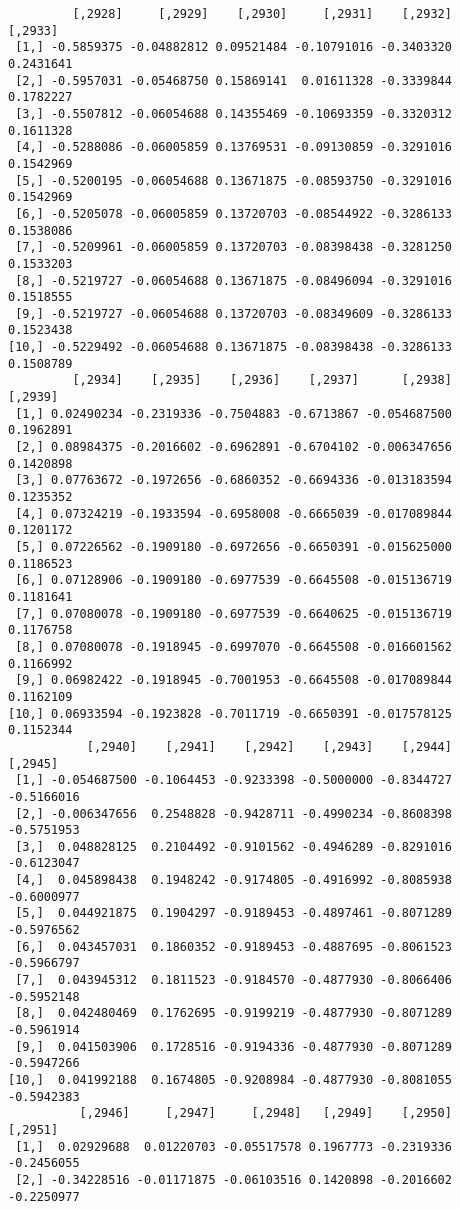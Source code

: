 \documentclass[
  letterpaper,
  DIV=11,
  numbers=noendperiod]{scrreprt}
\begin{document}
\begin{verbatim}
         [,2928]     [,2929]    [,2930]     [,2931]    [,2932]   [,2933]
 [1,] -0.5859375 -0.04882812 0.09521484 -0.10791016 -0.3403320 0.2431641
 [2,] -0.5957031 -0.05468750 0.15869141  0.01611328 -0.3339844 0.1782227
 [3,] -0.5507812 -0.06054688 0.14355469 -0.10693359 -0.3320312 0.1611328
 [4,] -0.5288086 -0.06005859 0.13769531 -0.09130859 -0.3291016 0.1542969
 [5,] -0.5200195 -0.06054688 0.13671875 -0.08593750 -0.3291016 0.1542969
 [6,] -0.5205078 -0.06005859 0.13720703 -0.08544922 -0.3286133 0.1538086
 [7,] -0.5209961 -0.06005859 0.13720703 -0.08398438 -0.3281250 0.1533203
 [8,] -0.5219727 -0.06054688 0.13671875 -0.08496094 -0.3291016 0.1518555
 [9,] -0.5219727 -0.06054688 0.13720703 -0.08349609 -0.3286133 0.1523438
[10,] -0.5229492 -0.06054688 0.13671875 -0.08398438 -0.3286133 0.1508789
         [,2934]    [,2935]    [,2936]    [,2937]      [,2938]   [,2939]
 [1,] 0.02490234 -0.2319336 -0.7504883 -0.6713867 -0.054687500 0.1962891
 [2,] 0.08984375 -0.2016602 -0.6962891 -0.6704102 -0.006347656 0.1420898
 [3,] 0.07763672 -0.1972656 -0.6860352 -0.6694336 -0.013183594 0.1235352
 [4,] 0.07324219 -0.1933594 -0.6958008 -0.6665039 -0.017089844 0.1201172
 [5,] 0.07226562 -0.1909180 -0.6972656 -0.6650391 -0.015625000 0.1186523
 [6,] 0.07128906 -0.1909180 -0.6977539 -0.6645508 -0.015136719 0.1181641
 [7,] 0.07080078 -0.1909180 -0.6977539 -0.6640625 -0.015136719 0.1176758
 [8,] 0.07080078 -0.1918945 -0.6997070 -0.6645508 -0.016601562 0.1166992
 [9,] 0.06982422 -0.1918945 -0.7001953 -0.6645508 -0.017089844 0.1162109
[10,] 0.06933594 -0.1923828 -0.7011719 -0.6650391 -0.017578125 0.1152344
           [,2940]    [,2941]    [,2942]    [,2943]    [,2944]    [,2945]
 [1,] -0.054687500 -0.1064453 -0.9233398 -0.5000000 -0.8344727 -0.5166016
 [2,] -0.006347656  0.2548828 -0.9428711 -0.4990234 -0.8608398 -0.5751953
 [3,]  0.048828125  0.2104492 -0.9101562 -0.4946289 -0.8291016 -0.6123047
 [4,]  0.045898438  0.1948242 -0.9174805 -0.4916992 -0.8085938 -0.6000977
 [5,]  0.044921875  0.1904297 -0.9189453 -0.4897461 -0.8071289 -0.5976562
 [6,]  0.043457031  0.1860352 -0.9189453 -0.4887695 -0.8061523 -0.5966797
 [7,]  0.043945312  0.1811523 -0.9184570 -0.4877930 -0.8066406 -0.5952148
 [8,]  0.042480469  0.1762695 -0.9199219 -0.4877930 -0.8071289 -0.5961914
 [9,]  0.041503906  0.1728516 -0.9194336 -0.4877930 -0.8071289 -0.5947266
[10,]  0.041992188  0.1674805 -0.9208984 -0.4877930 -0.8081055 -0.5942383
          [,2946]     [,2947]     [,2948]   [,2949]    [,2950]    [,2951]
 [1,]  0.02929688  0.01220703 -0.05517578 0.1967773 -0.2319336 -0.2456055
 [2,] -0.34228516 -0.01171875 -0.06103516 0.1420898 -0.2016602 -0.2250977

\end{verbatim}
\end{document}
